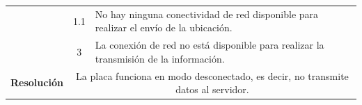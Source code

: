 \begin{table}[H]
\begin{tabularx}{\textwidth}{|c|c|X|}
    \cline{2-3}
                                                & 1.1                                                                                              & \multicolumn{1}{L|}{No hay ninguna conectividad de red disponible para realizar el envío de la ubicación.}                                                                                    \\
    \cline{2-3}
                                                & 3                                                                                                & \multicolumn{1}{L|}{La conexión de red no está disponible para realizar la transmisión de la información.}                                                                                    \\
    \hline\hline
    \textbf{Resolución}                        & \multicolumn{2}{X|}{La placa funciona en modo desconectado, es decir, no transmite datos al servidor.}                                                                                                                                                      \\
    \hline
  \end{tabularx}
\end{table}

